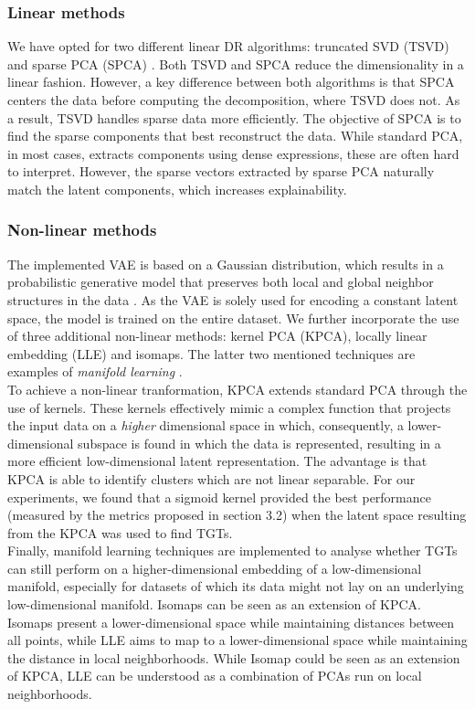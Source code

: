 \subsubsection{Linear methods}
We have opted for two different linear DR algorithms: truncated SVD (TSVD) and sparse PCA (SPCA) \cite{doi:10.1198/106186006X113430}. Both TSVD and SPCA reduce the dimensionality in a linear fashion. However, a key difference between both algorithms is that SPCA centers the data before computing the decomposition, where TSVD does not. As a result, TSVD handles sparse data more efficiently. The objective of SPCA is to find the sparse components that best reconstruct the data. While standard PCA, in most cases, extracts components using dense expressions, these are often hard to interpret. However, the sparse vectors extracted by sparse PCA naturally match the latent components, which increases explainability.

\subsubsection{Non-linear methods}
The implemented VAE is based on a Gaussian distribution, which results in a probabilistic generative model that preserves both local and global neighbor structures in the data \cite{ding2018interpretable}. As the VAE is solely used for encoding a constant latent space, the model is trained on the entire dataset. We further incorporate the use of three additional non-linear methods: kernel PCA (KPCA), locally linear embedding (LLE) \cite{Roweis2323} and isomaps. The latter two mentioned techniques are examples of \textit{manifold learning} \cite{cayton2005algorithms}.\\

To achieve a non-linear tranformation, KPCA \cite{10.1007/BFb0020217} extends standard PCA through the use of kernels. These kernels effectively mimic a complex function that projects the input data on a \textit{higher} dimensional space in which, consequently, a lower-dimensional subspace is found in which the data is represented, resulting in a more efficient low-dimensional latent representation. The advantage is that KPCA is able to identify clusters which are not linear separable. For our experiments, we found that a sigmoid kernel provided the best performance (measured by the metrics proposed in section 3.2) when the latent space resulting from the KPCA was used to find TGTs.\\
    
Finally, manifold learning techniques are implemented to analyse whether TGTs can still perform on a higher-dimensional embedding of a low-dimensional manifold, especially for datasets of which its data might not lay on an underlying low-dimensional manifold. Isomaps can be seen as an extension of KPCA. Isomaps present a lower-dimensional space while maintaining distances between all points, while LLE aims to map to a lower-dimensional space while maintaining the distance in local neighborhoods. While Isomap could be seen as an extension of KPCA, LLE can be understood as a combination of PCAs run on local neighborhoods.\\

